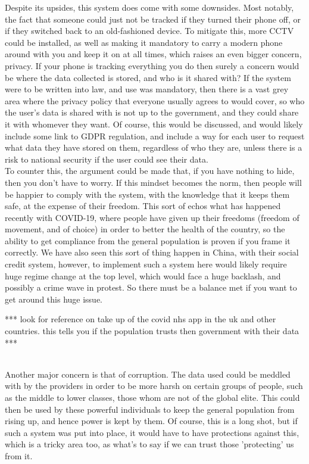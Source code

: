 
Despite its upsides, this system does come with some downsides.
Most notably, the fact that someone could just not be tracked if they turned their phone off, or if they switched
back to an old-fashioned device.
To mitigate this, more CCTV could be installed, as well as making it mandatory to carry a modern phone around with
you and keep it on at all times, which raises an even bigger concern, privacy.
If your phone is tracking everything you do then surely a concern would be where the data collected is stored, and
who is it shared with?
If the system were to be written into law, and use was mandatory, then there is a vast grey area where the
privacy policy that everyone usually agrees to would cover, so who the user's data is shared with is not up to the
government, and they could share it with whomever they want.
Of course, this would be discussed, and would likely include some link to GDPR regulation, and include a way for
each user to request what data they have stored on them, regardless of who they are, unless there is a risk to
national security if the user could see their data.
\\

To counter this, the argument could be made that, if you have nothing to hide, then you don't have to
worry.
If this mindset becomes the norm, then people will be happier to comply with the system, with the knowledge that
it keeps them safe, at the expense of their freedom.
This sort of echos what has happened recently with COVID-19, where people have given up their freedoms (freedom of
movement, and of choice) in order to better the health of the country, so the ability to get compliance from the
general population is proven if you frame it correctly.
We have also seen this sort of thing happen in China, with their social credit system, however, to implement such a
system here would likely require huge regime change at the top level, which would face a huge backlash, and
possibly a crime wave in protest.
So there must be a balance met if you want to get around this huge issue.

*** look for reference on take up of the covid nhs app in the uk and other countries. this tells you if the population trusts then government with their data  ***

\\

Another major concern is that of corruption.
The data used could be meddled with by the providers in order to be more harsh on certain groups of people, such as
the middle to lower classes, those whom are not of the global elite.
This could then be used by these powerful individuals to keep the general population from rising up, and hence power
is kept by them.
Of course, this is a long shot, but if such a system was put into place, it would have to have protections against
this, which is a tricky area too, as what's to say if we can trust those 'protecting' us from it.

